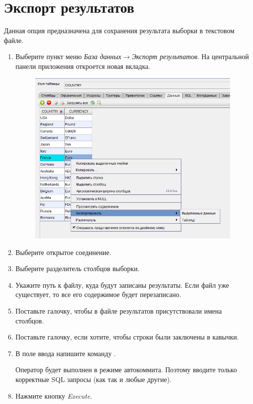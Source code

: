 \section{Экспорт результатов}\label{sec:export_results}
Данная опция предназначена для сохранения результата выборки  в текстовом файле. 
\begin{enumerate}[leftmargin=39pt]
	\item Выберите пункт меню \textit{База данных}$\rightarrow$\textit{Экспорт результатов}. На центральной панели приложения откроется новая вкладка.
	\begin{figure}[H]
		\flushright
		\includegraphics[width = 0.9\linewidth]{img/export_set.png}
	\end{figure}
	\item Выберите открытое соединение.
	\item Выберите разделитель столбцов выборки.
	\item Укажите путь к файлу, куда будут записаны результаты. Если файл уже существует, то все его содержимое будет перезаписано.
	\item Поставьте галочку, чтобы в файле результатов присутствовали имена столбцов.
	\item Поставьте галочку, если хотите, чтобы строки были заключены в кавычки.
	\item В поле ввода напишите команду .
	\begin{redremark}
		Оператор будет выполнен в режиме автокоммита. Поэтому вводите только корректные SQL запросы (как  так и любые другие).
	\end{redremark} 
	\item Нажмите кнопку \textit{Execute}.
\end{enumerate}

